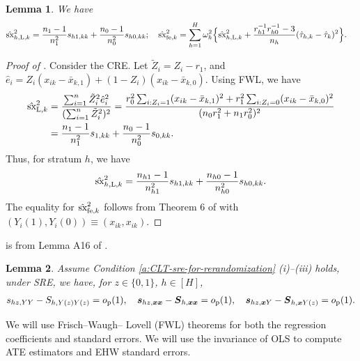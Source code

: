 \documentclass[12pt]{article}
\newtheorem{lemma}{Lemma}
\newcommand{\Lin}{\textnormal{L}}
\newcommand{\op}{o_{\textnormal{p}}}
\newcommand{\fe}{\textnormal{fe}}
\newcommand{\bs}{\boldsymbol}
\newcommand{\sx}{\textnormal{sx}}
\begin{document}
\begin{lemma}
    \label{lem:ehw-of-covariate}
    We have
    \begin{align*}
        &\hat{\sx}^2_{h,\Lin,k} =  \frac{n_1-1}{n_1^2}s_{h1,kk}  + \frac{n_0-1}{n_0^2}s_{h0,kk};  \quad \hat{\sx}^2_{\fe ,k} = \sum_{h=1}^H \omega_h^2 \Big\{\hat{\sx}^2_{h,\Lin,k} + \frac{r_{h1}^{-1}r_{h0}^{-1}-3}{n_h}(\hat{\tau}_{h,k}-\hat{\tau}_{k})^2\Big\}.
    \end{align*}
\end{lemma}
\begin{proof}[Proof of ]
  Consider the CRE.  Let $\tilde{Z}_i = Z_i - r_1$, and $\hat{e}_i = Z_i(x_{ik}-\bar{x}_{k,1}) + (1-Z_i)(x_{ik}-\bar{x}_{k,0})$. Using FWL, we have 
    \begin{align*}
    \hat{\sx}^2_{\Lin,k} & = \frac{\sum_{i=1}^n \tilde{Z}_i^2 \hat{e}_i^2}{(\sum_{i=1}^n \tilde{Z}_i^2)^2} = \frac{r_0^2 \sum_{i:Z_i=1}(x_{ik}-\bar{x}_{k,1})^2 + r_1^2 \sum_{i:Z_i=0}(x_{ik}-\bar{x}_{k,0})^2}{(n_0 r_1^2 + n_1 r_0^2)^2}\\
    & = \frac{n_1-1}{n_1^2}s_{1,kk}  + \frac{n_0-1}{n_0^2}s_{0,kk}. 
    \end{align*}
    Thus, for stratum $h$, we have
    \[
    \hat{\sx}^2_{h,\Lin,k} =  \frac{n_{h1}-1}{n_{h1}^2}s_{h1,kk}  + \frac{n_{h0}-1}{n_{h0}^2}s_{h0,kk}.
    \]
    The equality for $\hat{\sx}^2_{\fe ,k}$ follows from Theorem $6$ of \cite{ding2021frisch} with $(Y_i(1),Y_i(0))\equiv (x_{ik}, x_{ik})$.
\end{proof}

 is from Lemma A16 of \cite{Li9157}.
\begin{lemma}
\label{lem:limit-of-sample-covariance}
    Assume Condition \ref{a:CLT-sre-for-rerandomization} (i)--(iii) holds, under SRE, we have, for $z\in \{0,1\}$, $h\in [H]$,
    \begin{gather*}
         s_{hz,YY} - S_{h, Y(z)Y(z)} = \op(1),\quad \bs{s}_{hz,\bs{x}\bs{x}}- \bs{S}_{h,\bs{x}\bs{x}}  = \op(1),\quad\bs{s}_{hz,\bs{x}Y}- \bs{S}_{h,\bs{x}Y(z)}  = \op(1).
    \end{gather*}
\end{lemma}

 We will use Frisch–Waugh–
Lovell (FWL) theorems \citep{ding2021frisch} for both the regression coefficients and standard errors. We will use the invariance of OLS to compute ATE estimators and EHW standard errors.
\end{document}
